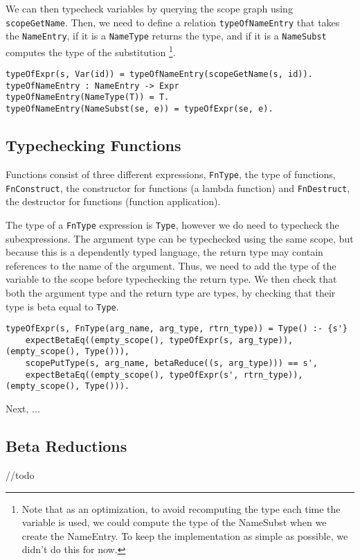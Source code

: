We can then typecheck variables by querying the scope graph using \verb|scopeGetName|. Then, we need to define a relation \verb|typeOfNameEntry| that takes the \verb|NameEntry|, if it is a \verb|NameType| returns the type, and if it is a \verb|NameSubst| computes the type of the substitution \footnote{Note that as an optimization, to avoid recomputing the type each time the variable is used, we could compute the type of the NameSubst when we create the NameEntry. To keep the implementation as simple as possible, we didn't do this for now.}. 

\begin{lstlisting}
typeOfExpr(s, Var(id)) = typeOfNameEntry(scopeGetName(s, id)).
typeOfNameEntry : NameEntry -> Expr
typeOfNameEntry(NameType(T)) = T.
typeOfNameEntry(NameSubst(se, e)) = typeOfExpr(se, e).
\end{lstlisting}

\subsection{Typechecking Functions}

Functions consist of three different expressions, \verb|FnType|, the type of functions, \verb|FnConstruct|, the constructor for functions (a lambda function) and \verb|FnDestruct|, the destructor for functions (function application).

 The type of a \verb|FnType| expression is \verb|Type|, however we do need to typecheck the subexpressions. The argument type can be typechecked using the same scope, but because this is a dependently typed language, the return type may contain references to the name of the argument. Thus, we need to add the type of the variable to the scope before typechecking the return type. We then check that both the argument type and the return type are types, by checking that their type is beta equal to \verb|Type|.
 
\begin{lstlisting}
typeOfExpr(s, FnType(arg_name, arg_type, rtrn_type)) = Type() :- {s'}
    expectBetaEq((empty_scope(), typeOfExpr(s, arg_type)), (empty_scope(), Type())),
    scopePutType(s, arg_name, betaReduce((s, arg_type))) == s',
	expectBetaEq((empty_scope(), typeOfExpr(s', rtrn_type)), (empty_scope(), Type())).
\end{lstlisting}

Next, ...

\subsection{Beta Reductions}
//todo



